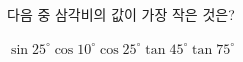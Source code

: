 다음 중 삼각비의 값이 가장 작은 것은?
\begin{choices32}{$\sin 25^\circ$}{$\cos 10^\circ$}{$\cos 25^\circ$}{$\tan 45^\circ$}{$\tan 75^\circ$}\end{choices32}

